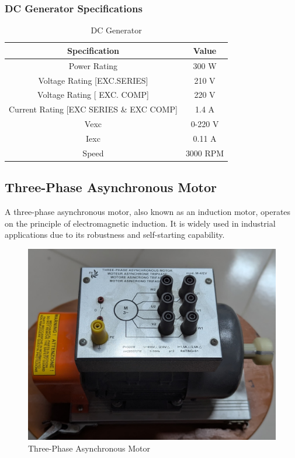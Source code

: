 \documentclass[a4paper,12pt]{article}
\begin{document}
	\subsubsection{DC Generator Specifications}
	\begin{table}[H]
		\centering
		\caption{DC Generator}
		\begin{tabular}{| c | c |}
			\hline
			\textbf{Specification} & \textbf{Value} \\ \hline
			Power Rating & 300 W\\ \hline
			Voltage Rating [EXC.SERIES] & 210 V \\ \hline
			Voltage Rating [ EXC. COMP] & 220 V \\ \hline
			Current Rating [EXC SERIES \& EXC COMP] & 1.4 A \\ \hline
			Vexc & 0-220 V \\ \hline
			Iexc & 0.11 A \\ \hline
			Speed & 3000 RPM \\ \hline
			
		\end{tabular}
		
		\label{tab:2}
	\end{table}

	\subsection{Three-Phase Asynchronous Motor}
	A three-phase asynchronous motor, also known as an induction motor, operates on the principle of electromagnetic induction. It is widely used in industrial applications due to its robustness and self-starting capability.
	\begin{figure}[H]
		\centering
			\includegraphics[width=.7\linewidth, height=0.25\textheight]{"Images/7"}
		\caption{Three-Phase Asynchronous Motor}
		
	\end{figure}
\end{document}
